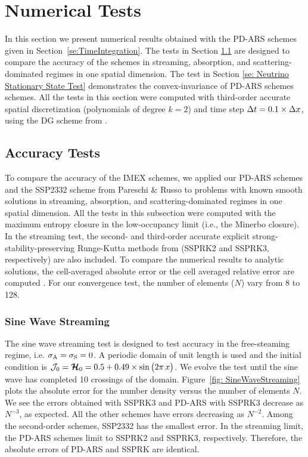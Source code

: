 \section{Numerical Tests}\label{se:NumericalTests}

In this section we present numerical results obtained with the PD-ARS schemes given in Section~\ref{se:TimeIntegration}.
The tests in Section \ref{se: Accuracy Tests} are designed to compare the accuracy of the schemes in streaming, absorption, and scattering-dominated regimes in one spatial dimension.
The test in Section \ref{se: Neutrino Stationary State Test} demonstrates the convex-invariance of PD-ARS schemes schemes.
All the tests in this section were computed with third-order accurate spatial discretization (polynomials of degree $k=2$) and time step $\Delta t = 0.1 \times \Delta x $, using the DG scheme from \cite{chu_etal_2018}.

\subsection{Accuracy Tests}
\label{se: Accuracy Tests}

To compare the accuracy of the IMEX schemes, we applied our PD-ARS schemes and the SSP2332 scheme from Pareschi \& Russo \cite{pareschiRusso_2005} to problems with known smooth solutions in streaming, absorption, and scattering-dominated regimes in one spatial dimension.  
All the tests in this subsection were computed with the maximum entropy closure in the low-occupancy limit (i.e., the Minerbo closure).  
In the streaming test, the second- and third-order accurate explicit strong-stability-preserving Runge-Kutta methods from \cite{gottlieb_etal_2001} (SSPRK2 and SSPRK3, respectively) are also included.  
To compare the numerical results to analytic solutions, the cell-averaged absolute error or the cell averaged relative error are computed .  
For our convergence test, the number of elements ($N$) vary from 8 to 128.  

\subsubsection{Sine Wave Streaming}

The sine wave streaming test is designed to test accuracy in the free-steaming regime, i.e. $\sigma_{{\rm A}} = \sigma_{{\rm S}} = 0$.
A periodic domain of unit length is used and the initial condition is $\mathcal{J}_{0} = \boldsymbol{\mathcal{H}}_{0} = 0.5+0.49\times\sin\big(2\pi\,x\big)$.
We evolve the test until the sine wave has completed 10 crossings of the domain.
Figure~\ref{fig: SineWaveStreaming} plots the absolute error for the number density versus the number of elements $N$.
We see the errors obtained with SSPRK3 and PD-ARS with SSPRK3 decrease as $N^{-3}$, as expected.
All the other schemes have errors decreasing as $N^{-2}$.
Among the second-order schemes, SSP2332 has the smallest error.
In the streaming limit, the PD-ARS schemes limit to SSPRK2 and SSPRK3, respectively.
Therefore, the absolute errors of PD-ARS and SSPRK are identical.  

